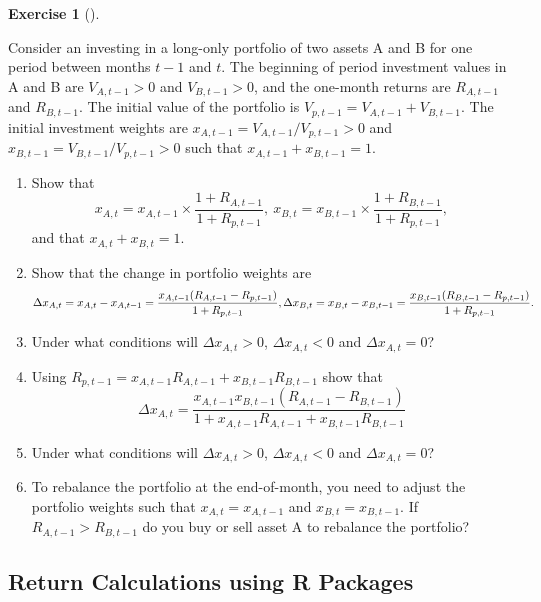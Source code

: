 \documentclass[
  letterpaper,
  DIV=11,
  numbers=noendperiod]{scrreprt}
\providecommand{\tightlist}{%
  \setlength{\itemsep}{0pt}\setlength{\parskip}{0pt}}\usepackage{longtable,booktabs,array}
\theoremstyle{definition}
\newtheorem{exercise}{Exercise}[chapter]
\theoremstyle{definition}
\theoremstyle{remark}
\begin{document}
\begin{exercise}[]\protect\hypertarget{exr-exercise0110}{}\label{exr-exercise0110}

Consider an investing in a long-only portfolio of two assets A and B for
one period between months \(t-1\) and \(t\). The beginning of period
investment values in A and B are \(V_{A,t-1}>0\) and \(V_{B,t-1}>0\),
and the one-month returns are \(R_{A,t-1}\) and \(R_{B,t-1}\). The
initial value of the portfolio is \(V_{p,t-1}=V_{A,t-1}+V_{B,t-1}\). The
initial investment weights are \(x_{A,t-1}=V_{A,t-1}/V_{p,t-1}>0\) and
\(x_{B,t-1}=V_{B,t-1}/V_{p,t-1}>0\) such that \(x_{A,t-1}+x_{B,t-1}=1\).

\begin{enumerate}
\def\labelenumi{\arabic{enumi}.}
\tightlist
\item
  Show that
  \[x_{A,t} = x_{A,t-1} \times \frac{1+R_{A,t-1}}{1+R_{p,t-1}},~ x_{B,t} = x_{B,t-1} \times \frac{1+R_{B,t-1}}{1+R_{p,t-1}},\]
  and that \(x_{A,t}+x_{B,t}=1\).
\item
  Show that the change in portfolio weights are
  \[\Delta x_{A,t} = x_{A,t} - x_{A,t-1} = \frac{x_{A,t-1}(R_{A,t-1}-R_{p,t-1})}{1+R_{p,t-1}}, \\
  \Delta x_{B,t} = x_{B,t} - x_{B,t-1} = \frac{x_{B,t-1}(R_{B,t-1}-R_{p,t-1})}{1+R_{p,t-1}}.\]
\item
  Under what conditions will \(\Delta x_{A,t} >0\),
  \(\Delta x_{A,t} < 0\) and \(\Delta x_{A,t} =0\)?
\item
  Using \(R_{p,t-1}=x_{A,t-1}R_{A,t-1}+x_{B,t-1}R_{B,t-1}\) show that
  \[\Delta x_{A,t} = \frac{x_{A,t-1}x_{B,t-1}(R_{A,t-1}-R_{B,t-1})}{1+x_{A,t-1}R_{A,t-1}+x_{B,t-1}R_{B,t-1}}\]
\item
  Under what conditions will \(\Delta x_{A,t} >0\),
  \(\Delta x_{A,t} < 0\) and \(\Delta x_{A,t} =0\)?
\item
  To rebalance the portfolio at the end-of-month, you need to adjust the
  portfolio weights such that \(x_{A,t} = x_{A,t-1}\) and
  \(x_{B,t} = x_{B,t-1}\). If \(R_{A,t-1} > R_{B,t-1}\) do you buy or
  sell asset A to rebalance the portfolio?
\end{enumerate}

\end{exercise}

\hypertarget{return-calculations-using-r-packages}{%
\subsection*{Return Calculations using R
Packages}\label{return-calculations-using-r-packages}}
\end{document}
